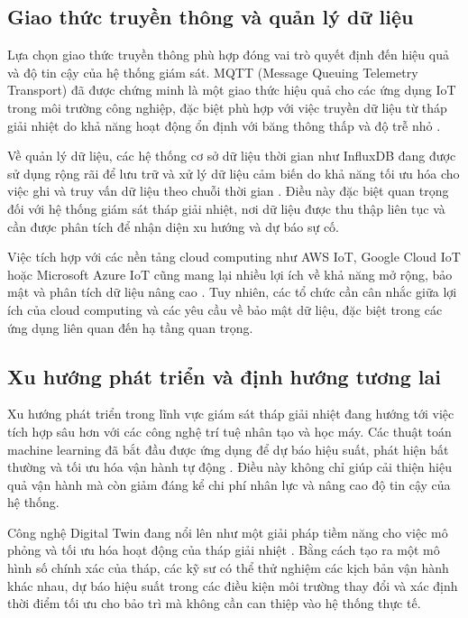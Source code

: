 \documentclass[../main.tex]{subfiles}
\begin{document}
\subsection{Giao thức truyền thông và quản lý dữ liệu}
\label{sec:communication_protocols}

Lựa chọn giao thức truyền thông phù hợp đóng vai trò quyết định đến hiệu quả và độ tin cậy của hệ thống giám sát. MQTT (Message Queuing Telemetry Transport) đã được chứng minh là một giao thức hiệu quả cho các ứng dụng IoT trong môi trường công nghiệp, đặc biệt phù hợp với việc truyền dữ liệu từ tháp giải nhiệt do khả năng hoạt động ổn định với băng thông thấp và độ trễ nhỏ \cite{cisco2023iot}.

Về quản lý dữ liệu, các hệ thống cơ sở dữ liệu thời gian như InfluxDB đang được sử dụng rộng rãi để lưu trữ và xử lý dữ liệu cảm biến do khả năng tối ưu hóa cho việc ghi và truy vấn dữ liệu theo chuỗi thời gian \cite{li2023ai}. Điều này đặc biệt quan trọng đối với hệ thống giám sát tháp giải nhiệt, nơi dữ liệu được thu thập liên tục và cần được phân tích để nhận diện xu hướng và dự báo sự cố.

Việc tích hợp với các nền tảng cloud computing như AWS IoT, Google Cloud IoT hoặc Microsoft Azure IoT cũng mang lại nhiều lợi ích về khả năng mở rộng, bảo mật và phân tích dữ liệu nâng cao \cite{google2023datacenter,microsoft2023azure}. Tuy nhiên, các tổ chức cần cân nhắc giữa lợi ích của cloud computing và các yêu cầu về bảo mật dữ liệu, đặc biệt trong các ứng dụng liên quan đến hạ tầng quan trọng.

\subsection{Xu hướng phát triển và định hướng tương lai}
\label{sec:future_trends}

Xu hướng phát triển trong lĩnh vực giám sát tháp giải nhiệt đang hướng tới việc tích hợp sâu hơn với các công nghệ trí tuệ nhân tạo và học máy. Các thuật toán machine learning đã bắt đầu được ứng dụng để dự báo hiệu suất, phát hiện bất thường và tối ưu hóa vận hành tự động \cite{li2023ai,pham2023adaptive}. Điều này không chỉ giúp cải thiện hiệu quả vận hành mà còn giảm đáng kể chi phí nhân lực và nâng cao độ tin cậy của hệ thống.

Công nghệ Digital Twin đang nổi lên như một giải pháp tiềm năng cho việc mô phỏng và tối ưu hóa hoạt động của tháp giải nhiệt \cite{zhao2023digital}. Bằng cách tạo ra một mô hình số chính xác của tháp, các kỹ sư có thể thử nghiệm các kịch bản vận hành khác nhau, dự báo hiệu suất trong các điều kiện môi trường thay đổi và xác định thời điểm tối ưu cho bảo trì mà không cần can thiệp vào hệ thống thực tế.
\end{document}
